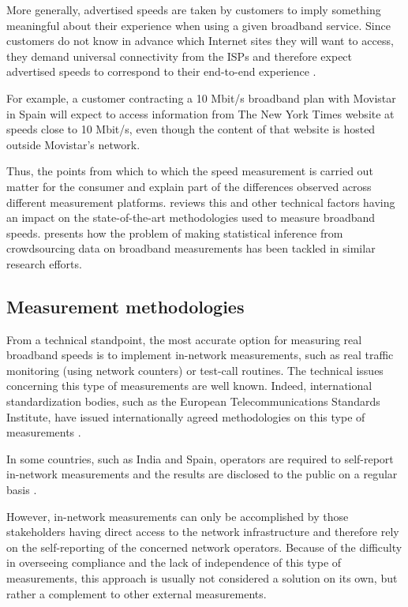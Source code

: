 \documentclass[12pt]{article}
\begin{document}
More generally, advertised speeds are taken by customers to imply something meaningful about their experience when using a given broadband service. Since customers do not know in advance which Internet sites they will want to access, they demand universal connectivity from the ISPs and therefore expect advertised speeds to correspond to their end-to-end experience \citep[see the discussion on the MCI merger in][pp. 508-511]{economides2008}. 

For example, a customer contracting a 10 Mbit/s broadband plan with Movistar in Spain will expect to access information from The New York Times website at speeds close to 10 Mbit/s, even though the content of that website is hosted outside Movistar's network.      

Thus, the points from which to which the speed measurement is carried out matter for the consumer and explain part of the differences observed across different measurement platforms.  reviews this and other technical factors having an impact on the state-of-the-art methodologies used to measure broadband speeds.  presents how the problem of making statistical inference from crowdsourcing data on broadband measurements has been tackled in similar research efforts.   

\subsection{Measurement methodologies} \label{meth}

From a technical standpoint, the most accurate option for measuring real broadband speeds is to implement in-network measurements, such as real traffic monitoring (using network counters) or test-call routines. The technical issues concerning this type of measurements are well known. Indeed,  international standardization bodies, such as the European Telecommunications Standards Institute, have issued internationally agreed methodologies on this type of measurements \citep{etsi}.

In some countries, such as India and Spain, operators are required to self-report in-network measurements and the results are disclosed to the public on a regular basis \citep{setsi,zuhyle2015}.

However, in-network measurements can only be accomplished by those stakeholders having direct access to the network infrastructure and therefore rely on the self-reporting of the concerned network operators. Because of the difficulty in overseeing compliance and the lack of independence of this type of measurements, this approach is usually not considered a solution on its own, but rather a complement to other external measurements.
\end{document}
